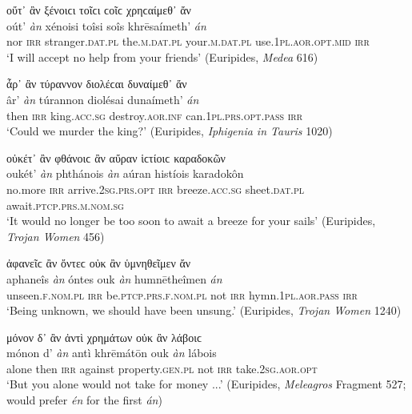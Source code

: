 \begin{exe}
\ex οὔτ᾽ ἂν ξένοιϲι τοῖϲι ϲοῖϲ χρηϲαίμεθ᾽ ἄν\\
\gll oút' \emph{àn} xénoisi toîsi soîs khrēsaímeth' \emph{án}\\
nor \textsc{irr} stranger.\textsc{dat.pl} the.\textsc{m.dat.pl} your.\textsc{m.dat.pl} use.\textsc{1pl.aor.opt.mid} \textsc{irr}\\
\trans `I will accept no help from your friends' (Euripides, \textit{Medea} 616)
\label{multian34}
\end{exe}

\begin{exe}
\ex ἆρ᾽ ἂν τύραννον διολέϲαι δυναίμεθ᾽ ἄν\\
\gll âr' \emph{àn} túrannon diolésai dunaímeth' \emph{án}\\
then \textsc{irr} king.\textsc{acc.sg} destroy.\textsc{aor.inf} can.\textsc{1pl.prs.opt.pass} \textsc{irr}\\
\trans `Could we murder the king?' (Euripides, \textit{Iphigenia in Tauris} 1020)
\label{multian35}
\end{exe}

\begin{exe}
\ex οὐκέτ᾽ ἂν φθάνοιϲ ἂν αὔραν ἱϲτίοιϲ καραδοκῶν\\
\gll oukét' \emph{àn} phthánois \emph{àn} aúran histíois karadokôn\\
no.more \textsc{irr} arrive.\textsc{2sg.prs.opt} \textsc{irr} breeze.\textsc{acc.sg} sheet.\textsc{dat.pl} await.\textsc{ptcp.prs.m.nom.sg}\\
\trans `It would no longer be too soon to await a breeze for your sails' (Euripides, \textit{Trojan Women} 456)
\label{multian36}
\end{exe}

\begin{exe}
\ex ἀφανεῖϲ ἂν ὄντεϲ οὐκ ἂν ὑμνηθεῖμεν ἄν\\
\gll aphaneîs \emph{àn} óntes ouk \emph{àn} humnētheîmen \emph{án}\\
unseen.\textsc{f.nom.pl} \textsc{irr} be.\textsc{ptcp.prs.f.nom.pl} not \textsc{irr} hymn.\textsc{1pl.aor.pass} \textsc{irr}\\
\trans `Being unknown, we should have been unsung.' (Euripides, \textit{Trojan Women} 1240)
\label{multian37}
\end{exe}

\begin{exe}
\ex μόνον δ᾽ ἂν ἀντὶ χρημάτων οὐκ ἂν λάβοιϲ\\
\gll mónon d' \emph{àn} antì khrēmátōn ouk \emph{àn} lábois\\
alone then \textsc{irr} against property.\textsc{gen.pl} not \textsc{irr} take.\textsc{2sg.aor.opt}\\
\trans `But you alone would not take for money ...' (Euripides, \textit{Meleagros} Fragment 527; \citealp[528--529]{Nauck1889} would prefer \textit{én} for the first \textit{án})
\label{multian38}
\end{exe}

